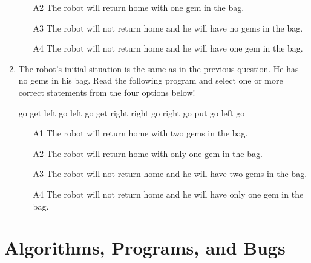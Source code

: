 \begin{enumerate}
\begin{enumerate}
\item[A2] The robot will return home with one gem in the bag.
\item[A3] The robot will not return home and he will have no gems in the bag.
\item[A4] The robot will not return home and he will have one gem in the bag.
\end{enumerate}
\item The robot's initial situation is the same as in the previous question. He has no gems 
in his bag. Read the following program and select one or more correct statements from the four options below!
\begin{bluecode}
go
get
left
go
left
go
get
right
right
go
right
go
put
go
left 
go
\end{bluecode}
\begin{enumerate}
\item[A1] The robot will return home with two gems in the bag.
\item[A2] The robot will return home with only one gem in the bag.
\item[A3] The robot will not return home and he will have two gems in the bag.
\item[A4] The robot will not return home and he will have only one gem in the bag.
\end{enumerate}
\end{enumerate}


\section{Algorithms, Programs, and Bugs}

